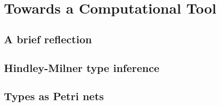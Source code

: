 \documentclass[../Dissertation.tex]{subfiles}
\begin{document}
\section{Towards a Computational Tool}
\subsection{A brief reflection}
\subsection{Hindley-Milner type inference}

\subsection{Types as Petri nets}
\end{document}
